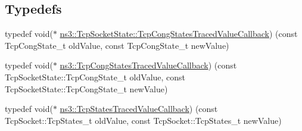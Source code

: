 \subsection*{Typedefs}
\begin{DoxyCompactItemize}
\item 
typedef void($\ast$ \hyperlink{group__tcp_ga17cd2398cfb9b9c1f991adf6d7f21e19}{ns3\+::\+Tcp\+Socket\+State\+::\+Tcp\+Cong\+States\+Traced\+Value\+Callback}) (const Tcp\+Cong\+State\+\_\+t old\+Value, const Tcp\+Cong\+State\+\_\+t new\+Value)
\item 
typedef void($\ast$ \hyperlink{group__tcp_ga6132ce5e376bdb6e343039abd59e0c57}{ns3\+::\+Tcp\+Cong\+States\+Traced\+Value\+Callback}) (const Tcp\+Socket\+State\+::\+Tcp\+Cong\+State\+\_\+t old\+Value, const Tcp\+Socket\+State\+::\+Tcp\+Cong\+State\+\_\+t new\+Value)
\item 
typedef void($\ast$ \hyperlink{group__tcp_ga2f3674b9fd52fcc3f4ef27a8932424f2}{ns3\+::\+Tcp\+States\+Traced\+Value\+Callback}) (const Tcp\+Socket\+::\+Tcp\+States\+\_\+t old\+Value, const Tcp\+Socket\+::\+Tcp\+States\+\_\+t new\+Value)
\end{DoxyCompactItemize}
